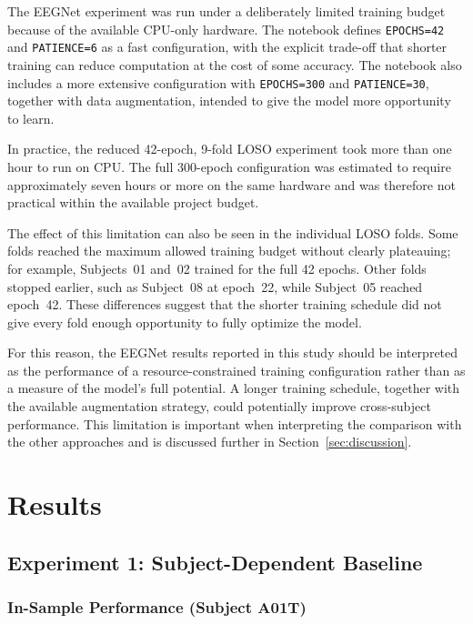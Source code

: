 \documentclass[11pt,a4paper]{article}
\begin{document}
The EEGNet experiment was run under a deliberately limited training budget because of the available
CPU-only hardware. The notebook defines \texttt{EPOCHS=42} and \texttt{PATIENCE=6} as a fast
configuration, with the explicit trade-off that shorter training can reduce computation at the
cost of some accuracy. The notebook also includes a more extensive configuration with
\texttt{EPOCHS=300} and \texttt{PATIENCE=30}, together with data augmentation, intended to give
the model more opportunity to learn.

In practice, the reduced 42-epoch, 9-fold LOSO experiment took more than one hour to run on CPU.
The full 300-epoch configuration was estimated to require approximately seven hours or more on the
same hardware and was therefore not practical within the available project budget.

The effect of this limitation can also be seen in the individual LOSO folds. Some folds reached the
maximum allowed training budget without clearly plateauing; for example, Subjects~01 and~02 trained
for the full 42 epochs. Other folds stopped earlier, such as Subject~08 at epoch~22, while
Subject~05 reached epoch~42. These differences suggest that the shorter training schedule did not
give every fold enough opportunity to fully optimize the model.

For this reason, the EEGNet results reported in this study should be interpreted as the performance
of a resource-constrained training configuration rather than as a measure of the model's full
potential. A longer training schedule, together with the available augmentation strategy, could
potentially improve cross-subject performance. This limitation is important when interpreting the
comparison with the other approaches and is discussed further in Section~\ref{sec:discussion}.

\section{Results}
\label{sec:results}

\subsection{Experiment 1: Subject-Dependent Baseline}
\label{sec:results-exp1}

\subsubsection{In-Sample Performance (Subject A01T)}
\end{document}
